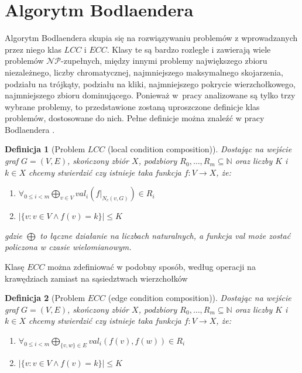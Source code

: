 \documentclass[twoside,a4paper,12pt]{report} %
\theoremstyle{break}
\newtheorem{definition}{Definicja}[section]
\begin{document}
\section{Algorytm Bodlaendera} \label{sekcja_5.2}

Algorytm Bodlaendera skupia się na rozwiązywaniu problemów z wprowadzanych przez niego klas $LCC$ i $ECC$. Klasy te są bardzo rozległe i zawierają wiele problemów $\mathcal{NP}$-zupełnych, między innymi problemy największego zbioru niezależnego, liczby chromatycznej, najmniejszego maksymalnego skojarzenia, podziału na trójkąty, podziału na kliki, najmniejszego pokrycie wierzchołkowego, najmniejszego zbioru dominującego. Ponieważ w~pracy analizowane są tylko trzy wybrane problemy, to przedstawione zostaną uproszczone definicje klas problemów, dostosowane do nich. Pełne definicje można znaleźć w pracy Bodlaendera \cite{bodlaender2}.

\begin{definition}[Problem $LCC$ (local condition composition)]
Dostając na wejście graf $G=(V,E)$, skończony zbiór $X$, podzbiory $R_0,\dots, R_m \subseteq \mathbb{N}$ oraz liczby $K$ i $k \in X$ chcemy stwierdzić czy istnieje taka funkcja $f:V\rightarrow X$, że:
\begin{enumerate}
    \item $\forall_{0 \le i < m} \bigoplus_{v \in V} val_i(f|_{N_c(v,G)}) \in R_i$
    \item $|\{v \colon v \in V \land f(v)=k\}| \le K$
\end{enumerate}
gdzie $\bigoplus$ to łączne działanie na liczbach naturalnych, a funkcja \emph{val} może zostać policzona w czasie wielomianowym.
\end{definition}

Klasę $ECC$ można zdefiniować w podobny sposób, według operacji na krawędziach zamiast na sąsiedztwach wierzchołków

\begin{definition}[Problem $ECC$ (edge condition composition)]
Dostając na wejście graf $G=(V,E)$, skończony zbiór $X$, podzbiory $R_0,\dots, R_m \subseteq \mathbb{N}$ oraz liczby $K$ i $k \in X$ chcemy stwierdzić czy istnieje taka funkcja $f:V\rightarrow X$, że:
\begin{enumerate}
    \item $\forall_{0 \le i < m} \bigoplus_{\{v,w\}\in E} val_i (f(v), f(w)) \in R_i$
    \item $|\{v \colon v \in V \land  f(v)=k\}| \le K$
\end{enumerate}
\end{definition}
\end{document}

